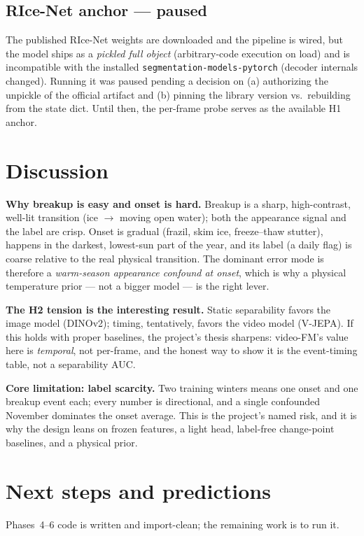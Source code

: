 \documentclass[11pt]{article}
\begin{document}
\subsection{RIce-Net anchor --- paused}
The published RIce-Net weights are downloaded and the pipeline is wired, but the model ships as a
\emph{pickled full object} (arbitrary-code execution on load) and is incompatible with the
installed \texttt{segmentation-models-pytorch} (decoder internals changed). Running it was paused
pending a decision on (a) authorizing the unpickle of the official artifact and (b) pinning the
library version vs.\ rebuilding from the state dict. Until then, the per-frame probe serves as the
available H1 anchor.

\section{Discussion}
\textbf{Why breakup is easy and onset is hard.} Breakup is a sharp, high-contrast, well-lit
transition (ice $\rightarrow$ moving open water); both the appearance signal and the label are
crisp. Onset is gradual (frazil, skim ice, freeze--thaw stutter), happens in the darkest, lowest-sun
part of the year, and its label (a daily flag) is coarse relative to the real physical transition.
The dominant error mode is therefore a \emph{warm-season appearance confound at onset}, which is
why a physical temperature prior --- not a bigger model --- is the right lever.

\textbf{The H2 tension is the interesting result.} Static separability favors the image model
(DINOv2); timing, tentatively, favors the video model (V-JEPA). If this holds with proper
baselines, the project's thesis sharpens: video-FM's value here is \emph{temporal}, not per-frame,
and the honest way to show it is the event-timing table, not a separability AUC.

\textbf{Core limitation: label scarcity.} Two training winters means one onset and one breakup
event each; every number is directional, and a single confounded November dominates the onset
average. This is the project's named risk, and it is why the design leans on frozen features, a
light head, label-free change-point baselines, and a physical prior.

\section{Next steps and predictions}
Phases~4--6 code is written and import-clean; the remaining work is to run it.
\end{document}
